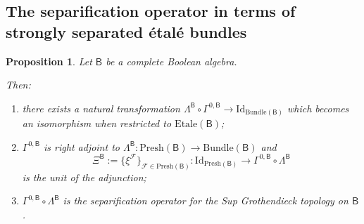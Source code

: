 \documentclass[11pt]{amsart}
\newcommand{\F}{\mathcal{F}}
\newcommand{\Id}{\textrm{Id}}
\newcommand{\Presh}{\textrm{Presh}}
\newcommand{\bundle}{\textrm{Bundle}}
\newcommand{\etale}{\textrm{Etale}}
\theoremstyle{plain}
\newtheorem{proposition}[theorem]{Proposition}
\theoremstyle{definition}
\theoremstyle{plain}
\theoremstyle{remark}
\DeclareMathOperator{\St}{St}
\newcommand{\bool}[1]{\mathsf{#1}}
\newcommand{\0}{\mathsf{0}}
\renewcommand{\1}{\mathsf{1}}
\renewcommand{\2}{\mathsf{2}}
\theoremstyle{definition}
\begin{document}
\subsection{The separification operator in terms of  strongly separated \'etal\'e bundles}

\begin{proposition}\label{lem:Jsepbindles1}
Let $\bool{B}$ be a complete Boolean algebra. 

Then: 
\begin{enumerate}
\item  \label{lem:Jsepbindles1-2}
there exists a natural transformation 
$\Lambda^{\bool{B}}\circ\Gamma^{0,\bool{B}}\to\Id_{\bundle(\bool{B})}$ which becomes an isomorphism when restricted to $\etale(\bool{B})$;
\item \label{lem:Jsepbindles1-3}
$\Gamma^{0,\bool{B}}$ is right adjoint to $\Lambda^{\bool{B}}:\Presh(\bool{B})\to\bundle(\bool{B})$ and
\[\Xi^{\bool{B}}:=\{\xi^\F\}_{\F\in\Presh(\bool{B})}:\Id_{\Presh(\bool{B})}\to\Gamma^{0,\bool{B}}\circ \Lambda^{\bool{B}}\] is the unit of the adjunction;
\item \label{lem:Jsepbindles1-4}
$\Gamma^{0,\bool{B}}\circ \Lambda^{\bool{B}}$ is the separification operator for the Sup Grothendieck topology on $\bool{B}$. 
\end{enumerate}
\end{proposition}
\end{document}
